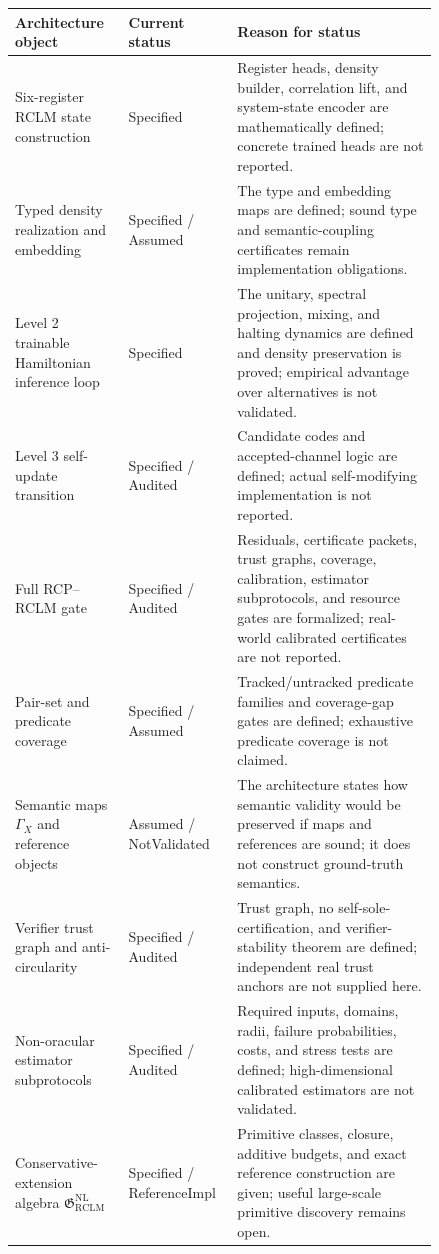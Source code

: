 \documentclass[11pt,a4paper]{article}
\newcommand{\RCLM}{\mathrm{RCLM}}
\newcommand{\NL}{\mathrm{NL}}
\begin{document}
\begin{longtable}{p{0.24\linewidth}p{0.17\linewidth}p{0.43\linewidth}}
\toprule
\textbf{Architecture object} & \textbf{Current status} & \textbf{Reason for status}\\
\midrule
\endhead
\bottomrule
\endlastfoot
Six-register RCLM state construction & Specified & Register heads, density builder, correlation lift, and system-state encoder are mathematically defined; concrete trained heads are not reported.\\
Typed density realization and embedding & Specified / Assumed & The type and embedding maps are defined; sound type and semantic-coupling certificates remain implementation obligations.\\
Level 2 trainable Hamiltonian inference loop & Specified & The unitary, spectral projection, mixing, and halting dynamics are defined and density preservation is proved; empirical advantage over alternatives is not validated.\\
Level 3 self-update transition & Specified / Audited & Candidate codes and accepted-channel logic are defined; actual self-modifying implementation is not reported.\\
Full RCP--RCLM gate & Specified / Audited & Residuals, certificate packets, trust graphs, coverage, calibration, estimator subprotocols, and resource gates are formalized; real-world calibrated certificates are not reported.\\
Pair-set and predicate coverage & Specified / Assumed & Tracked/untracked predicate families and coverage-gap gates are defined; exhaustive predicate coverage is not claimed.\\
Semantic maps \(\Gamma_X\) and reference objects & Assumed / NotValidated & The architecture states how semantic validity would be preserved if maps and references are sound; it does not construct ground-truth semantics.\\
Verifier trust graph and anti-circularity & Specified / Audited & Trust graph, no self-sole-certification, and verifier-stability theorem are defined; independent real trust anchors are not supplied here.\\
Non-oracular estimator subprotocols & Specified / Audited & Required inputs, domains, radii, failure probabilities, costs, and stress tests are defined; high-dimensional calibrated estimators are not validated.\\
Conservative-extension algebra \(\mathfrak G_{\RCLM}^{\NL}\) & Specified / ReferenceImpl & Primitive classes, closure, additive budgets, and exact reference construction are given; useful large-scale primitive discovery remains open.\\

\end{longtable}
\end{document}
